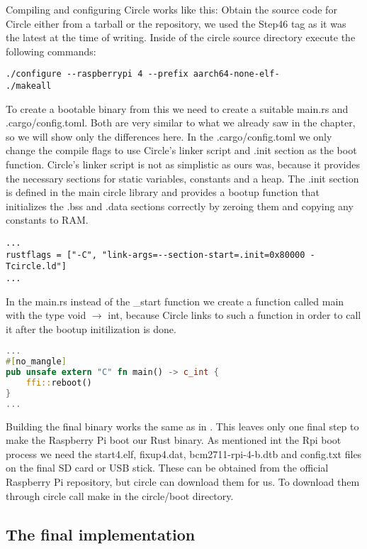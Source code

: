 Compiling and configuring Circle works like this:
Obtain the source code for Circle either from a tarball or the repository, we used the Step46 tag as it was the latest at the time of writing.
Inside of the circle source directory execute the following commands:
\begin{verbatim}
./configure --raspberrypi 4 --prefix aarch64-none-elf-
./makeall
\end{verbatim}

To create a bootable binary from this we need to create a suitable main.rs and .cargo/config.toml.
Both are very similar to what we already saw in the  chapter, so we will show only the differences here.
In the .cargo/config.toml we only change the compile flags to use Circle's linker script and .init section as the boot function.
Circle's linker script is not as simplistic as ours was, because it provides the necessary sections for static variables, constants and a heap.
The .init section is defined in the main circle library and provides a bootup function that initializes the .bss and .data sections correctly by zeroing them and copying any constants to RAM.
\begin{verbatim}
...
rustflags = ["-C", "link-args=--section-start=.init=0x80000 -Tcircle.ld"]
...
\end{verbatim}

In the main.rs instead of the \_start function we create a function called main with the type void $\rightarrow$ int,
because Circle links to such a function in order to call it after the bootup initilization is done.
\begin{lstlisting}[language=Rust,style=colouredRust]
...
#[no_mangle]
pub unsafe extern "C" fn main() -> c_int {
    ffi::reboot()
}
...
\end{lstlisting}

Building the final binary works the same as in .
This leaves only one final step to make the Raspberry Pi boot our Rust binary.
As mentioned int the Rpi boot process we need the start4.elf, fixup4.dat, bcm2711-rpi-4-b.dtb and config.txt files on the final SD card or USB stick.
These can be obtained from the official Raspberry Pi repository, but circle can download them for us.
To download them through circle call make in the circle/boot directory.

\subsection{The final implementation}
\label{sec:concept_and_implementation:bare-metal:implementation}

